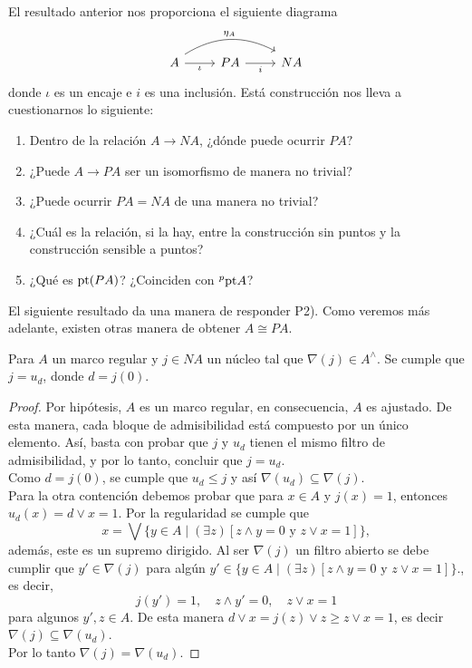 El resultado anterior nos proporciona el siguiente diagrama
\[
\begin{tikzcd}
A \arrow[r, "\iota"'] \arrow[rr, "\eta_A", bend left, shift left] & PA \arrow[r, "i"'] & NA
\end{tikzcd}
\]
donde $\iota$ es un encaje e $i$ es una inclusión. Está construcción nos lleva a cuestionarnos lo siguiente:
\begin{enumerate}[P1)]
    \item Dentro de la relación $A\to NA$, ¿dónde puede ocurrir $PA?$
    \item ¿Puede $A\to PA$ ser un isomorfismo de manera no trivial?
    \item ¿Puede ocurrir $PA=NA$ de una manera no trivial?
    \item ¿Cuál es la relación, si la hay, entre la construcción sin puntos y la construcción sensible a puntos?

    \item ¿Qué es $\mathrm{pt} (PA)$? ¿Coinciden con $^p\mathrm{pt} A$?
\end{enumerate}

El siguiente resultado da una manera de responder P2). Como veremos más adelante, existen otras manera de obtener $A\cong PA$.

\begin{thm}\label{Teorema7.1.4}
    Para $A$ un marco regular y $j\in NA$ un núcleo tal que $\nabla(j)\in A^\wedge$. Se cumple que $j=u_d$, donde $d=j(0)$. 
\end{thm}

\begin{proof}
    Por hipótesis, $A$ es un marco regular, en consecuencia, $A$ es ajustado. De esta manera, cada bloque de admisibilidad está compuesto por un único elemento. Así, basta con probar que $j$ y $u_d$ tienen el mismo filtro de admisibilidad, y por lo tanto, concluir que $j=u_d$.\\

    Como $d=j(0)$, se cumple que $u_d\leq j$ y así $\nabla(u_d)\subseteq \nabla(j)$.\\
    
    Para la otra contención debemos probar que para $x\in A$ y $j(x)=1$, entonces $u_d(x)=d\vee x=1$. Por la regularidad se cumple que 
    \[
    x=\bigvee\{y\in A\mid (\exists z)[z\wedge y=0 \mbox{ y } z\vee x=1]\},
    \]
    además, este es un supremo dirigido. Al ser $\nabla(j)$ un filtro abierto se debe cumplir que $y'\in\nabla(j)$ para algún $y'\in \{y\in A\mid (\exists z)[z\wedge y=0 \mbox{ y } z\vee x=1]\}$., es decir,
    \[
    j(y')=1, \quad z\wedge y'=0, \quad z\vee x=1
    \]
    para algunos $y', z\in A$. De esta manera $d\vee x=j(z)\vee z\geq z\vee x=1$, es decir $\nabla(j)\subseteq\nabla(u_d)$.\\

    Por lo tanto $\nabla(j)=\nabla(u_d)$.
\end{proof}

